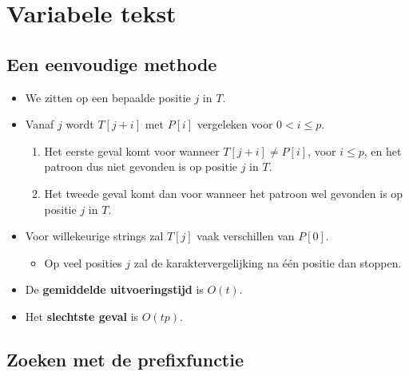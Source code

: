 \section{Variabele tekst}

\subsection{Een eenvoudige methode}
\begin{itemize}
    \item We zitten op een bepaalde positie $j$ in $T$.
    \item Vanaf $j$ wordt $T[j + i]$ met $P[i]$ vergeleken voor $0 < i \leq p$.
    \begin{enumerate}
        \item Het eerste geval komt voor wanneer $T[j + i] \neq P[i]$, voor $i \leq p$, en het patroon dus niet gevonden is op positie $j$ in $T$.
        \item Het tweede geval komt dan voor wanneer het patroon wel gevonden is op positie $j$ in $T$.
    \end{enumerate}
    \item Voor willekeurige strings zal $T[j]$ vaak verschillen van $P[0]$.
    \begin{itemize}
        \item Op veel posities $j$ zal de karaktervergelijking na één positie dan stoppen.
    \end{itemize}
    \item De \textbf{gemiddelde uitvoeringstijd} is $O(t)$.
    \item Het \textbf{slechtste geval} is $O(tp)$.
\end{itemize}



\subsection{Zoeken met de prefixfunctie}
